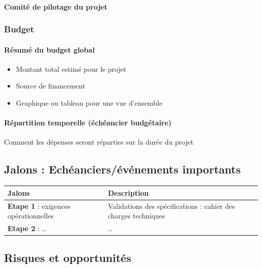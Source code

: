 \paragraph{Comité de pilotage du projet}

\subsubsection{Budget}
\paragraph{Résumé du budget global}
\begin{itemize}
    \item Montant total estimé pour le projet
    \item Source de financement 
    \item Graphique ou tableau pour une vue d'ensemble
\end{itemize}
\paragraph{Répartition temporelle (échéancier budgétaire)}
Comment les dépenses seront réparties sur la durée du projet

\subsection{Jalons : Echéanciers/événements importants}
\begin{table}[!h]
    \centering  
    \begin{tabular}{|p{7cm}|p{7cm}|}  
    \hline  
    \textbf{Jalons} & \textbf{Description}\\
    \hline
    \textbf{Etape 1 }: exigences opérationnelles & Validations des spécifications : cahier des charges techniques\\
    \hline
    \textbf{Etape 2} : \dots & \dots\\
    \hline
    \end{tabular}
\end{table}
\subsection{Risques et opportunités}
